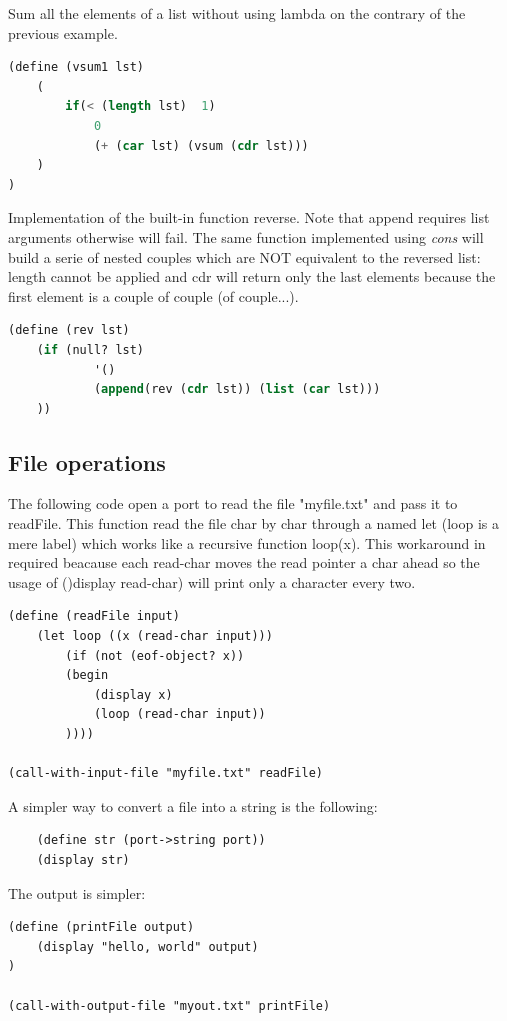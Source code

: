 Sum all the elements of a list without using lambda on the contrary of the previous example. 
\begin{lstlisting}[language=lisp]
(define (vsum1 lst) 
	(
		if(< (length lst)  1)
			0
			(+ (car lst) (vsum (cdr lst)))
	)	
)
\end{lstlisting}

Implementation of the built-in function reverse. Note that append requires list arguments otherwise will fail. The same function implemented using \textit{cons} will build a serie of nested couples which are NOT equivalent to the reversed list: length cannot be applied and cdr will return only the last elements because the first element is a couple of couple (of couple...).
\begin{lstlisting}[language=lisp]
(define (rev lst)
	(if (null? lst)
			'()
			(append(rev (cdr lst)) (list (car lst)))
	))
\end{lstlisting}

\subsection{File operations}
The following code open a port to read the file "myfile.txt" and pass it to readFile. This function read the file char by char through a named let (loop is a mere label) which works like a recursive function loop(x). This workaround in required beacause each read-char moves the read pointer a char ahead so the usage of ()display read-char) will print only a character every two.
\begin{lstlisting}
(define (readFile input)
	(let loop ((x (read-char input)))
		(if (not (eof-object? x))
		(begin
			(display x)
			(loop (read-char input))
		))))

(call-with-input-file "myfile.txt" readFile)
\end{lstlisting}

A simpler way to convert a file into a string is the following:
\begin{lstlisting}
	(define str (port->string port))
	(display str)
\end{lstlisting}

The output is simpler:
\begin{lstlisting}
(define (printFile output)
	(display "hello, world" output)
)

(call-with-output-file "myout.txt" printFile)
\end{lstlisting}

